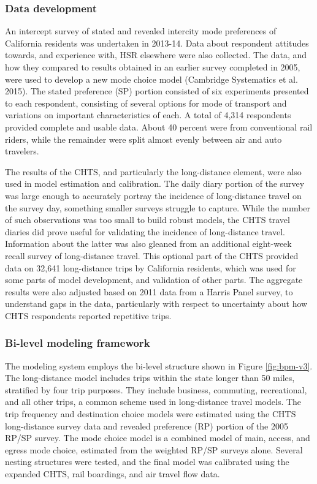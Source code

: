 \subsubsection{Data development}

An intercept survey of stated and revealed intercity mode preferences of California residents was undertaken in 2013-14. Data about respondent attitudes towards, and experience with, HSR elsewhere were also collected. The data, and how they compared to results obtained in an earlier survey completed in 2005, were used to develop a new mode choice model (Cambridge Systematics et al. 2015). The stated preference (SP) portion consisted of six experiments presented to each respondent, consisting of several options for mode of transport and variations on important characteristics of each. A total of 4,314 respondents provided complete and usable data. About 40 percent were from conventional rail riders, while the remainder were split almost evenly between air and auto travelers.

The results of the CHTS, and particularly the long-distance element, were also used in model estimation and calibration. The daily diary portion of the survey was large enough to accurately portray the incidence of long-distance travel on the survey day, something smaller surveys struggle to capture. While the number of such observations was too small to build robust models, the CHTS travel diaries did prove useful for validating the incidence of long-distance travel. Information about the latter was also gleaned from an additional eight-week recall survey of long-distance travel. This optional part of the CHTS provided data on 32,641 long-distance trips by California residents, which was used for some parts of model development, and validation of other parts. The aggregate results were also adjusted based on 2011 data from a Harris Panel survey, to understand gaps in the data, particularly with respect to uncertainty about how CHTS respondents reported repetitive trips.

\subsubsection{Bi-level modeling framework}

The modeling system employs the bi-level structure shown in Figure \ref{fig:bpm-v3}. The long-distance model includes trips within the state longer than 50 miles, stratified by four trip purposes. They include business, commuting, recreational, and all other trips, a common scheme used in long-distance travel models. The trip frequency and destination choice models were estimated using the CHTS long-distance survey data and revealed preference (RP) portion of the 2005 RP/SP survey. The mode choice model is a combined model of main, access, and egress mode choice, estimated from the weighted RP/SP surveys alone. Several nesting structures were tested, and the final model was calibrated using the expanded CHTS, rail boardings, and air travel flow data.

